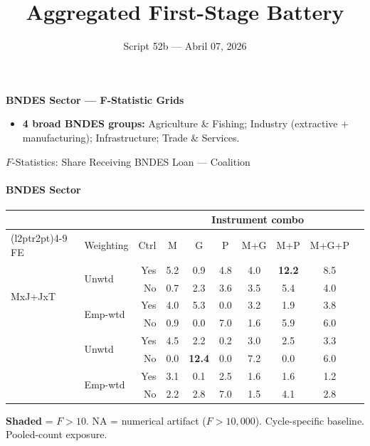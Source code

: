 \documentclass[aspectratio=169,10pt]{beamer}
\title{Aggregated First-Stage Battery}
\subtitle{Script 52b --- Abril 07, 2026}
\author{}
\date{}
\newcommand{\fpass}[1]{\cellcolor{pass}\textbf{#1}}
\begin{document}
\begin{frame}
\titlepage
\end{frame}


\begin{frame}[plain]
\begin{center}
{\Large\textbf{BNDES Sector --- F-Statistic Grids}}\\[0.5em]
\end{center}
\small
\begin{itemize}
\item \textbf{4 broad BNDES groups:} Agriculture \& Fishing; Industry (extractive + manufacturing); Infrastructure; Trade \& Services.
\end{itemize}
\vfill
\end{frame}

\begin{frame}[t]{$F$-Statistics: Share Receiving BNDES Loan --- Coalition}
\framesubtitle{BNDES Sector}
\begin{center}
\footnotesize
\setlength{\tabcolsep}{3.5pt}
\renewcommand{\arraystretch}{1.05}
\begin{tabular}{@{}llrccccccc@{}}
\toprule
 & & & \multicolumn{6}{c}{Instrument combo} \\
\cmidrule(l{2pt}r{2pt}){4-9}
FE & Weighting & Ctrl & M & G & P & M+G & M+P & M+G+P \\
\midrule
  \multirow{4}{*}{MxJ+JxT} & \multirow{2}{*}{Unwtd} & Yes & 5.2 & 0.9 & 4.8 & 4.0 & \fpass{12.2} & 8.5 \\
   &  & No & 0.7 & 2.3 & 3.6 & 3.5 & 5.4 & 4.0 \\
   & \multirow{2}{*}{Emp-wtd} & Yes & 4.0 & 5.3 & 0.0 & 3.2 & 1.9 & 3.8 \\
   &  & No & 0.9 & 0.0 & 7.0 & 1.6 & 5.9 & 6.0 \\
\addlinespace[5pt]
  \multirow{4}{*}{MxJ+MxT} & \multirow{2}{*}{Unwtd} & Yes & 4.5 & 2.2 & 0.2 & 3.0 & 2.5 & 3.3 \\
   &  & No & 0.0 & \fpass{12.4} & 0.0 & 7.2 & 0.0 & 6.0 \\
   & \multirow{2}{*}{Emp-wtd} & Yes & 3.1 & 0.1 & 2.5 & 1.6 & 1.6 & 1.2 \\
   &  & No & 2.2 & 2.8 & 7.0 & 1.5 & 4.1 & 2.8 \\
\bottomrule
\end{tabular}
\end{center}
{\scriptsize \colorbox{pass}{\textbf{Shaded}} = $F>10$. NA = numerical artifact ($F>10{,}000$). Cycle-specific baseline. Pooled-count exposure.}
\end{frame}
\end{document}
